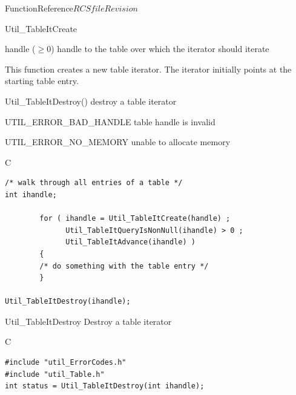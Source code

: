 \begin{cactuspart}{FunctionReference}{$RCSfile$}{$Revision$}
\begin{FunctionDescription}{Util\_TableItCreate}
\begin{ParameterSection}
\begin{Parameter}{handle ($\ge 0$)}
handle to the table over which the iterator should iterate
\end{Parameter}
\end{ParameterSection}

\begin{Discussion}
This function creates a new table iterator.  The iterator initially
points at the starting table entry.
\end{Discussion}

\begin{SeeAlsoSection}
\begin{SeeAlso}{Util\_TableItDestroy()}
destroy a table iterator
\end{SeeAlso}
\end{SeeAlsoSection}

\begin{ErrorSection}
\begin{Error}{UTIL\_ERROR\_BAD\_HANDLE}
table handle is invalid
\end{Error}
\begin{Error}{UTIL\_ERROR\_NO\_MEMORY}
unable to allocate memory
\end{Error}
\end{ErrorSection}

\begin{ExampleSection}
\begin{Example}{C}
\begin{verbatim}
/* walk through all entries of a table */
int ihandle;

        for ( ihandle = Util_TableItCreate(handle) ;
              Util_TableItQueryIsNonNull(ihandle) > 0 ;
              Util_TableItAdvance(ihandle) )
        {
        /* do something with the table entry */
        }

Util_TableItDestroy(ihandle);
\end{verbatim}
\end{Example}
\end{ExampleSection}
\end{FunctionDescription}


\begin{FunctionDescription}{Util\_TableItDestroy}
\label{Util-TableItDestroy}
Destroy a table iterator

\begin{SynopsisSection}
\begin{Synopsis}{C}
\begin{verbatim}
#include "util_ErrorCodes.h"
#include "util_Table.h"
int status = Util_TableItDestroy(int ihandle);
\end{verbatim}
\end{Synopsis}
\end{SynopsisSection}


\end{FunctionDescription}
\end{cactuspart}
